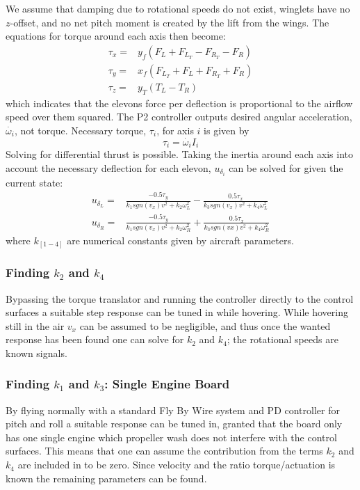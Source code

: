 \documentclass{article}
\begin{document}
We assume that damping due to rotational speeds do not exist, winglets have no $z$-offset, and no net pitch moment is created by the lift from the wings.
The equations for torque around each axis then become:
\begin{equation}
\begin{split}
    \tau_x =& y_f ( F_L + F_{L_T} - F_{R_T} -F_R) \\
    \tau_y =& x_f ( F_{L_T} + F_L + F_{R_T} + F_R) \\
    \tau_z =& y_T ( T_L - T_R)
\end{split}
\end{equation}
which indicates that the elevons force per deflection is proportional to the airflow speed over them squared.
The P2 controller outputs desired angular acceleration, $\dot{\omega_i}$, not torque.
Necessary torque, $\tau_i$, for axis $i$ is given by
\begin{equation}
    \tau_i = \dot{\omega_i} I_i
\end{equation}
Solving for differential thrust is possible.
Taking the inertia around each axis into account the necessary deflection for each elevon, $u_{\delta_i}$ can be solved for given the current state:
\begin{equation}
\begin{split}
    u_{\delta_L} =& \frac{-0.5 \tau_y}{k_1 sgn(v_x) v^2 + k_2 \omega_L^2} - \frac{0.5 \tau_x}{k_3 sgn(v_x) v^2 + k_4\omega_L^2} \\
    u_{\delta_R} =& \frac{-0.5 \tau_y}{k_1 sgn(v_x) v^2 + k_2 \omega_R^2} + \frac{0.5 \tau_x}{k_3 sgn(vx) v^2 + k_4 \omega_R^2} 
\end{split}
\end{equation}
where $k_{[1-4]}$ are numerical constants given by aircraft parameters.

\subsubsection{Finding $k_2$ and $k_4$}
Bypassing the torque translator and running the controller directly to the control surfaces a suitable step response can be tuned in while hovering.
While hovering still in the air $v_x$ can be assumed to be negligible, and thus once the wanted response has been found one can solve for $k_2$ and $k_4$; the rotational speeds are known signals.

\subsubsection{Finding $k_1$ and $k_3$: Single Engine Board}
By flying normally with a standard Fly By Wire system and PD controller for pitch and roll a suitable response can be tuned in, granted that the board only has one single engine which propeller wash does not interfere with the control surfaces.
This means that one can assume the contribution from the terms $k_2$ and $k_4$ are included in to be zero.
Since velocity and the ratio torque/actuation is known the remaining parameters can be found.
\end{document}
